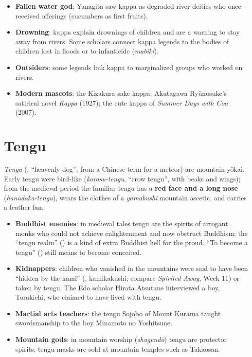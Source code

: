 \begin{important}[Interpretations]
\begin{itemize}
  \item \textbf{Fallen water god}: Yanagita saw kappa as degraded river deities who once
        received offerings (cucumbers as first fruits).
  \item \textbf{Drowning}: kappa explain drownings of children and are a warning to stay
        away from rivers. Some scholars connect kappa legends to the bodies of children lost
        in floods or to infanticide (\emph{mabiki}).
  \item \textbf{Outsiders}: some legends link kappa to marginalized groups who worked on rivers.
  \item \textbf{Modern mascots}: the Kizakura sake kappa; Akutagawa Ryūnosuke's satirical
        novel \emph{Kappa} (1927); the cute kappa of \emph{Summer Days with Coo} (2007).
\end{itemize}
\end{important}

\section{Tengu}

\begin{definition}[Tengu]
\emph{Tengu} (, ``heavenly dog'', from a Chinese term for a meteor) are mountain
yōkai. Early tengu were bird-like (\emph{karasu-tengu}, ``crow tengu'', with beaks and
wings); from the medieval period the familiar tengu has a \textbf{red face and a long nose}
(\emph{hanadaka-tengu}), wears the clothes of a \emph{yamabushi} mountain ascetic, and
carries a feather fan.
\end{definition}

\begin{itemize}
  \item \textbf{Buddhist enemies}: in medieval tales tengu are the spirits of arrogant monks
        who could not achieve enlightenment and now obstruct Buddhism; the ``tengu realm''
        () is a kind of extra Buddhist hell for the proud. ``To become a tengu''
        () still means to become conceited.
  \item \textbf{Kidnappers}: children who vanished in the mountains were said to have been
        ``hidden by the kami'' (, kamikakushi; compare \emph{Spirited Away},
        Week 11) or taken by tengu. The Edo scholar Hirata Atsutane interviewed a boy,
        Torakichi, who claimed to have lived with tengu.
  \item \textbf{Martial arts teachers}: the tengu Sōjōbō of Mount Kurama taught swordsmanship
        to the boy Minamoto no Yoshitsune.
  \item \textbf{Mountain gods}: in mountain worship (\emph{shugendō}) tengu are protector
        spirits; tengu masks are sold at mountain temples such as Takaosan.
\end{itemize}

